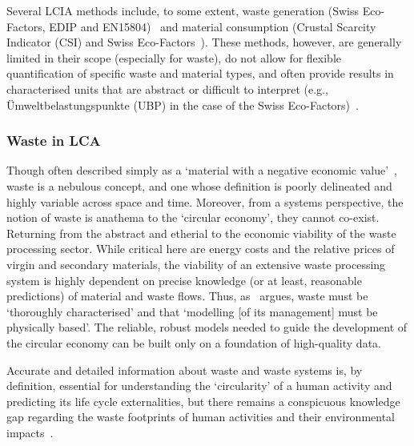 Several LCIA methods include, to some extent, waste generation (Swiss Eco-Factors, EDIP and EN15804)~\citep{foen2021ecofactors,hauschild2003edip,cen2019en15804} and material consumption (Crustal Scarcity Indicator (CSI) and Swiss Eco-Factors~\citep{arvidsson2020csi,foen2021ecofactors}). These methods, however, are generally limited in their scope (especially for waste), do not allow for flexible quantification of specific waste and material types, and often provide results in characterised units that are abstract or difficult to interpret (e.g., Ümweltbelastungspunkte (UBP) in the case of the Swiss Eco-Factors)~\citep{su2020sustainableproddev}.


\subsubsection{Waste in LCA}\label{sec:intro-waste}

Though often described simply as a `material with a negative economic value'~\citep{guinee2004economicallocation}, waste is a nebulous concept, and one whose definition is poorly delineated and highly variable across space and time.  Moreover, from a systems perspective, the notion of waste is anathema to the `circular economy', they cannot co-exist. Returning from the abstract and etherial to the economic viability of the waste processing sector. While critical here are energy costs and the relative prices of virgin and secondary materials, the viability of an extensive waste processing system is highly dependent on precise knowledge (or at least, reasonable predictions) of material and waste flows. Thus, as~\cite{bisinella2024wastelca} argues, waste must be `thoroughly characterised' and that `modelling [of its management] must be physically based'. The reliable, robust models needed to guide the development of the circular economy can be built only on a foundation of high-quality data.

Accurate and detailed information about waste and waste systems is, by definition, essential for understanding the `circularity' of a human activity and predicting its life cycle externalities, but there remains a conspicuous knowledge gap regarding the waste footprints of human activities and their environmental impacts~\citep{laurenti2023wastefootprint}.


